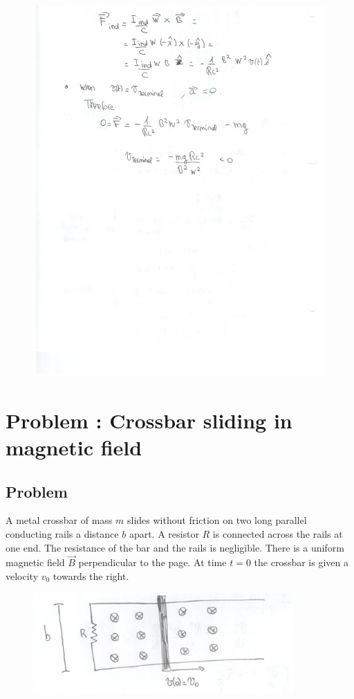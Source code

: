 \documentclass[solutions]{esg8022pset}
\begin{document}
    \begin{figure}[H]
    \centering
    \includegraphics[width = 25cm]{ps9_1b}
  \end{figure}
\section{Problem \thesection: Crossbar sliding in magnetic field}
\subsection{Problem}
A metal crossbar of mass $m$ slides without friction on two long parallel conducting rails a distance $b$ apart.
A resistor $R$ is connected across the rails at one end. The resistance of the bar and the rails is negligible.
There is a uniform magnetic field $\vec{B}$ perpendicular to the page. At time $t=0$ the crossbar is given a velocity
$v_0$ towards the right.

  \begin{figure}[H]
    \centering
    \includegraphics[width = 10cm]{crossbar}
    \label{fig:crossbar}
  \end{figure}
\end{document}
